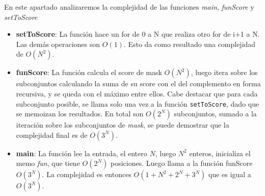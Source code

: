 En este apartado analizaremos la complejidad de las funciones \textit{main}, \textit{funScore} y \textit{setToScore}

\begin{itemize}
	\item \textbf{setToScore}: La funci\'on hace un for de 0 a N que realiza otro for de i+1 a N. Las dem\'as operaciones son $O(1)$. Esto da como resultado una complejidad de $O(N^2)$.

	\item \textbf{funScore}: La funci\'on calcula el score de mask $O(N^2)$, luego itera sobre los subconjuntos calculando la suma de su score con el del complemento en forma recursiva, y se queda con el m\'aximo entre ellos.
	Cabe destacar que para cada subconjunto posible, se llama solo una vez a la funci\'on \texttt{setToScore}, dado que se memoizan los resultados. En total son $O(2^N)$ subconjuntos, sumado a la iteraci\'on sobre los subconjuntos de \textit{mask}, se puede demostrar que la complejidad final es de $O(3^N)$.

	\item \textbf{main}: La funci\'on lee la entrada, el entero $N$, luego $N^2$ enteros, inicializa el memo \textit{fun}, que tiene $O(2^N)$ posiciones. Luego llama a la funci\'on funScore $O(3^N)$. La complejidad es entonces $O(1 + N^2 + 2^N + 3^N)$ que es igual a $O(3^N)$.
\end{itemize}
